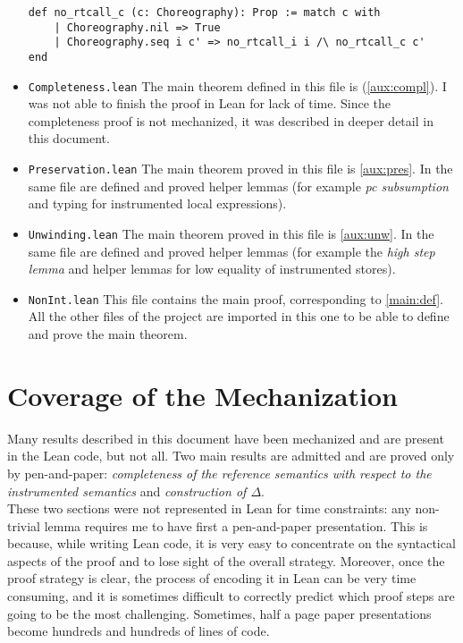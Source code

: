 \documentclass[12pt,a4paper,twoside]{book}
\begin{document}
\begin{itemize}
\begin{samepage}
\begin{verbatim}
def no_rtcall_c (c: Choreography): Prop := match c with
    | Choreography.nil => True
    | Choreography.seq i c' => no_rtcall_i i /\ no_rtcall_c c'
end
\end{verbatim}
\end{samepage}
\item \texttt{Completeness.lean} The main theorem defined in this file is (\ref{aux:compl}). I was not able to finish the proof in Lean for lack of time. Since the completeness proof is not mechanized, it was described in deeper detail in this document.
\item \texttt{Preservation.lean} The main theorem proved in this file is \ref{aux:pres}. In the same file are defined and proved helper lemmas (for example \emph{pc subsumption} and typing for instrumented local expressions).
\item \texttt{Unwinding.lean} The main theorem proved in this file is \ref{aux:unw}. In the same file are defined and proved helper lemmas (for example the \emph{high step lemma}\cite{myers2011proving} and helper lemmas for low equality of instrumented stores).
\item \texttt{NonInt.lean} This file contains the main proof, corresponding to \ref{main:def}.
All the other files of the project are imported in this one to be able to define and prove the main theorem.
\end{itemize}

\section{Coverage of the Mechanization}
Many results described in this document have been mechanized and are present in the Lean code, but not all.
Two main results are admitted and are proved only by pen-and-paper: \emph{completeness of the reference semantics with respect to the instrumented semantics} and \emph{construction of $\Delta$}.\\
These two sections were not represented in Lean for time constraints: any non-trivial lemma requires me to have first a pen-and-paper presentation. This is because, while writing Lean code, it is very easy to concentrate on the syntactical aspects of the proof and to lose sight of the overall strategy.
Moreover, once the proof strategy is clear, the process of encoding it in Lean can be very time consuming, and it is sometimes difficult to correctly predict which proof steps are going to be the most challenging. Sometimes, half a page paper presentations become hundreds and hundreds of lines of code.
\end{document}
